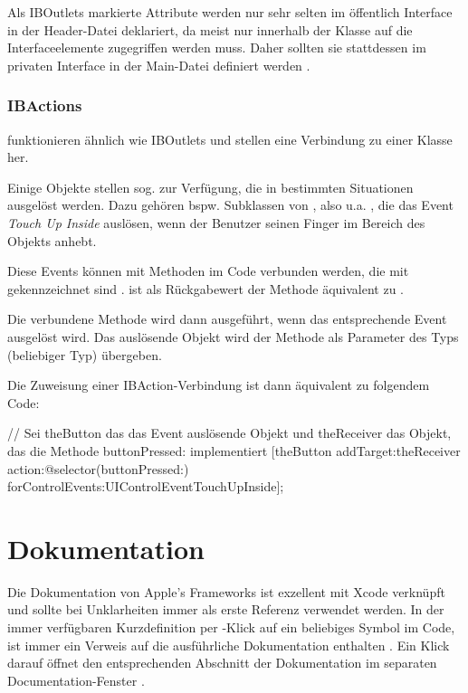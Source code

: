 \documentclass[parskip=half, final]{scrreprt}
\begin{document}
Als IBOutlets markierte Attribute werden nur sehr selten im öffentlich Interface in der Header-Datei deklariert, da meist nur innerhalb der Klasse auf die Interfaceelemente zugegriffen werden muss. Daher sollten sie stattdessen im privaten Interface in der Main-Datei definiert werden .


\subsubsection{IBActions}

 funktionieren ähnlich wie IBOutlets und stellen eine Verbindung zu  einer Klasse her.

Einige Objekte stellen sog.  zur Verfügung, die in bestimmten Situationen ausgelöst werden. Dazu gehören bspw. Subklassen von , also u.a. , die das Event \emph{Touch Up Inside} auslösen, wenn der Benutzer seinen Finger im Bereich des Objekts anhebt.

Diese Events können mit Methoden im Code verbunden werden, die mit  gekennzeichnet sind .  ist als Rückgabewert der Methode äquivalent zu .


Die verbundene Methode wird dann ausgeführt, wenn das entsprechende Event ausgelöst wird. Das auslösende Objekt wird der Methode als Parameter  des Typs  (beliebiger Typ) übergeben.

Die Zuweisung einer IBAction-Verbindung ist dann äquivalent zu folgendem Code:
\begin{objclst}
// Sei theButton das das Event auslösende Objekt und theReceiver das Objekt, das die Methode buttonPressed: implementiert
[theButton addTarget:theReceiver action:@selector(buttonPressed:) forControlEvents:UIControlEventTouchUpInside];
\end{objclst}

\section{Dokumentation}\label{sec:xcode_documentation}

Die Dokumentation von Apple's Frameworks ist exzellent mit Xcode verknüpft und sollte bei Unklarheiten immer als erste Referenz verwendet werden. In der immer verfügbaren Kurzdefinition per \keys{\altkey}-Klick auf ein beliebiges Symbol im Code, ist immer ein Verweis auf die ausführliche Dokumentation enthalten . Ein Klick darauf öffnet den entsprechenden Abschnitt der Dokumentation im separaten Documentation-Fenster .
\end{document}
